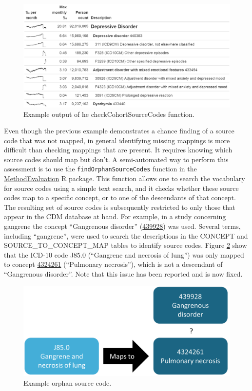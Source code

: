 \documentclass[11pt]{book}
\theoremstyle{definition}
\theoremstyle{definition}
\theoremstyle{definition}
\theoremstyle{remark}
\begin{document}
\begin{figure}

{\centering \includegraphics[width=1\linewidth]{images/DataQuality/sourceCodes} 

}

\caption{Example output of he checkCohortSourceCodes function. }\label{fig:sourceCodes}
\end{figure}

Even though the previous example demonstrates a chance finding of a source code that was not mapped, in general identifying missing mappings is more difficult than checking mappings that are present. It requires knowing which source codes should map but don't. A semi-automated way to perform this assessment is to use the \texttt{findOrphanSourceCodes} function in the \href{https://ohdsi.github.io/MethodEvaluation/}{MethodEvaluation} R package. This function allows one to search the vocabulary for source codes using a simple text search, and it checks whether these source codes map to a specific concept, or to one of the descendants of that concept. The resulting set of source codes is subsequently restricted to only those that appear in the CDM database at hand. For example, in a study concerning gangrene the concept ``Gangrenous disorder'' (\href{http://athena.ohdsi.org/search-terms/terms/439928}{439928}) was used. Several terms, including ``gangrene'', were used to search the descriptions in the CONCEPT and SOURCE\_TO\_CONCEPT\_MAP tables to identify source codes. Figure \ref{fig:missingMapping} show that the ICD-10 code J85.0 (``Gangrene and necrosis of lung'') was only mapped to concept \href{http://athena.ohdsi.org/search-terms/terms/4324261}{4324261} (``Pulmonary necrosis''), which is not a descendant of ``Gangrenous disorder''. Note that this issue has been reported and is now fixed.

\begin{figure}

{\centering \includegraphics[width=0.6\linewidth]{images/DataQuality/missingMapping} 

}

\caption{Example orphan source code. }\label{fig:missingMapping}
\end{figure}
\end{document}
